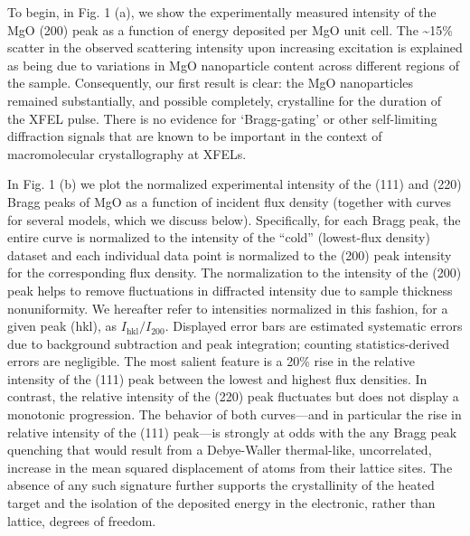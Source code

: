 To begin, in Fig. 1 (a), we show the experimentally measured intensity
of the MgO (200) peak as a function of energy deposited per MgO unit
cell. The \textasciitilde{}15\% scatter in the observed scattering
intensity upon increasing excitation is explained as being due to
variations in MgO nanoparticle content across different regions of the
sample. Consequently, our first result is clear: the MgO nanoparticles
remained substantially, and possible completely, crystalline for the
duration of the XFEL pulse. There is no evidence for `Bragg-gating' or
other self-limiting diffraction signals that are known to be important
in the context of macromolecular crystallography at XFELs. \cite{CALEMAN2015ULTRAFAST}

In Fig. 1 (b) we plot the normalized experimental intensity of the (111)
and (220) Bragg peaks of MgO as a function of incident flux density
(together with curves for several models, which we discuss below).
Specifically, for each Bragg peak, the entire curve is normalized to the
intensity of the ``cold'' (lowest-flux density) dataset and each
individual data point is normalized to the (200) peak intensity for the
corresponding flux density. The normalization to the intensity of the
(200) peak helps to remove fluctuations in diffracted intensity due to
sample thickness nonuniformity. We hereafter refer to intensities
normalized in this fashion, for a given peak (hkl), as
\(I_{\text{hkl}}/I_{200}\). Displayed error bars are estimated
systematic errors due to background subtraction and peak integration;
counting statistics-derived errors are negligible. The most salient
feature is a 20\% rise in the relative intensity of the (111) peak
between the lowest and highest flux densities. In contrast, the relative
intensity of the (220) peak fluctuates but does not display a monotonic
progression. The behavior of both curves---and in particular the rise in
relative intensity of the (111) peak---is strongly at odds with the any
Bragg peak quenching that would result from a Debye-Waller thermal-like,
uncorrelated, increase in the mean squared displacement of atoms from
their lattice sites. The absence of any such signature further supports
the crystallinity of the heated target and the isolation of the
deposited energy in the electronic, rather than lattice, degrees of
freedom.

